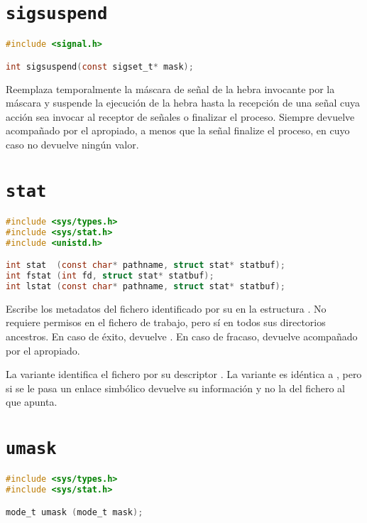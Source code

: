 \section{\texttt{sigsuspend}}\label{sigsuspend}

\begin{lstlisting}[language=C]
#include <signal.h>

int sigsuspend(const sigset_t* mask);
\end{lstlisting}

Reemplaza temporalmente la máscara de señal de la hebra invocante por la máscara  y suspende la ejecución de la hebra hasta la recepción de una señal cuya acción sea invocar al receptor de señales o finalizar el proceso.
Siempre devuelve  acompañado por el  apropiado, a menos que la señal finalize el proceso, en cuyo caso no devuelve ningún valor.

\section{\texttt{stat}}\label{stat}

\begin{lstlisting}[language=C]
#include <sys/types.h>
#include <sys/stat.h>
#include <unistd.h>

int stat  (const char* pathname, struct stat* statbuf);
int fstat (int fd, struct stat* statbuf);
int lstat (const char* pathname, struct stat* statbuf);
\end{lstlisting}

Escribe los metadatos del fichero identificado por su  en la estructura .
No requiere permisos en el fichero de trabajo, pero sí en todos sus directorios ancestros.
En caso de éxito, devuelve .
En caso de fracaso, devuelve  acompañado por el  apropiado.

La variante  identifica el fichero por su descriptor .
La variante  es idéntica a , pero si se le pasa un enlace simbólico devuelve su información y no la del fichero al que apunta.

\section{\texttt{umask}}\label{umask}

\begin{lstlisting}[language=C]
#include <sys/types.h>
#include <sys/stat.h>

mode_t umask (mode_t mask);
\end{lstlisting}

